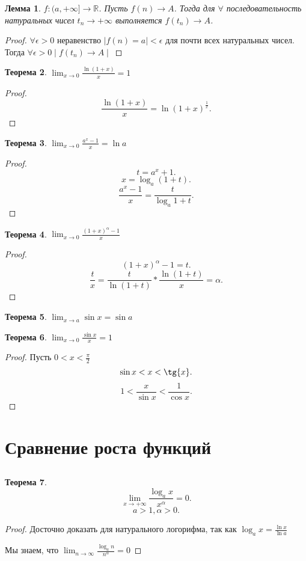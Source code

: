\documentclass[a4paper]{article}
\newtheorem{theorem}{Теорема}
\newtheorem{lemma}[theorem]{Лемма}
\begin{document}
\begin{lemma} \label{sd}
	$f : (a,+\infty] \to \mathbb{R}$. Пусть $f(n) \to A$. Тогда для $\forall $ последовательность натуральных чисел $t_n \to + \infty$ выполняется  $f(t_n) \to A$.
\end{lemma}
\begin{proof}
	$\forall  \epsilon > 0 $ неравенство $|f(n) = a| < \epsilon$ для почти всех натуральных чисел. Тогда
	$\forall \epsilon > 0 \mid f(t_n) \to A \mid$

\end{proof}
\begin{theorem}
	$\lim_{x \to 0} \frac{\ln{( 1 + x )}}{x} = 1$
\end{theorem}
\begin{proof}
	\[
		\frac{\ln(1 + x)}{x} = \ln{(1 + x)^{\frac{1}{x}}}
		.\]
\end{proof}
\begin{theorem}
	$\lim_{x \to 0} \frac{a^x - 1}{x} = \ln{a}$
\end{theorem}
\begin{proof}
	\[
		t = a^x + 1
		.\]
	\[
		x = \log_a{( 1 + t )}
		.\]
	\[
		\frac{a^x - 1 }{x} = \frac{t}{\log_a{1 + t}}
		.\]
\end{proof}
\begin{theorem}
	$\lim_{x \to 0} \frac{(1 + x)^{\alpha} - 1}{x}$
\end{theorem}
\begin{proof}
	\[
		(1 + x)^{\alpha} - 1 = t
		.\]
	\[
		\frac{t}{x} = \frac{t}{\ln{( 1 + t )}} * \frac{\ln{(1 + t)}}{x} = \alpha
		.\]
\end{proof}
\begin{theorem}
	$\lim_{x \to a} \sin{x} = \sin{a}$
\end{theorem}
\begin{theorem}
	$\lim_{x \to 0} \frac{\sin{x}}{x} = 1$
\end{theorem}
\begin{proof}
	Пусть $0 < x < \frac{\pi}{2}$
    \[
        \sin{x} < x <  \tg{x}
    .\] 
    \[
        1 < \frac{x}{\sin{x}} < \frac{1}{\cos{x}}
    .\] 
\end{proof}
\section{Сравнение роста функций}
\subsection{}
\begin{theorem}
    \[
        \lim_{x \to +\infty} \frac{\log_a{x}}{x^\alpha} = 0
    .\] 
    \[
        a > 1, \alpha > 0
    .\] 
\end{theorem}
\begin{proof}
Досточно доказать для натурального логорифма, так как $\log_a{x} = \frac{\ln{x}}{\ln{a}}$

Мы знаем, что $\lim_{n \to \infty} \frac{\log_a{n}}{n^\alpha} = 0$
\end{proof}
\end{document}
